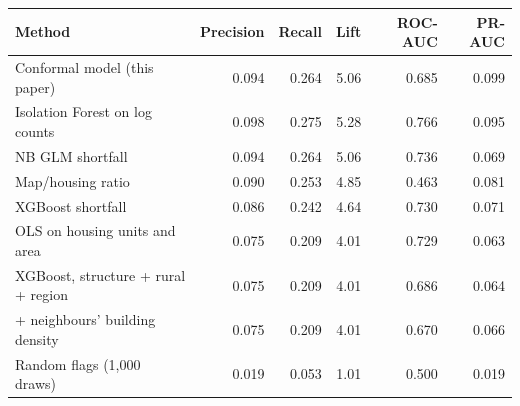 \begin{tabular}{lrrrrr}\toprule
Method & Precision & Recall & Lift & ROC-AUC & PR-AUC\\\midrule
Conformal model (this paper) & 0.094 & 0.264 & 5.06 & 0.685 & 0.099\\
Isolation Forest on log counts & 0.098 & 0.275 & 5.28 & 0.766 & 0.095\\
NB GLM shortfall & 0.094 & 0.264 & 5.06 & 0.736 & 0.069\\
Map/housing ratio & 0.090 & 0.253 & 4.85 & 0.463 & 0.081\\
XGBoost shortfall & 0.086 & 0.242 & 4.64 & 0.730 & 0.071\\
OLS on housing units and area & 0.075 & 0.209 & 4.01 & 0.729 & 0.063\\
XGBoost, structure + rural + region & 0.075 & 0.209 & 4.01 & 0.686 & 0.064\\
\quad + neighbours' building density & 0.075 & 0.209 & 4.01 & 0.670 & 0.066\\
Random flags (1,000 draws) & 0.019 & 0.053 & 1.01 & 0.500 & 0.019\\
\bottomrule\end{tabular}
